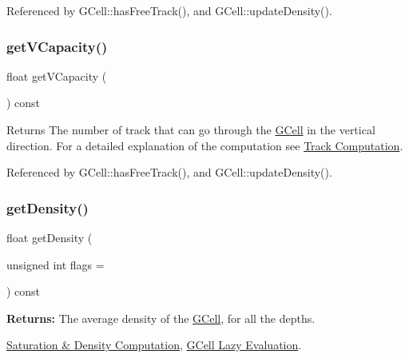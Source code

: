 Referenced by G\+Cell\+::has\+Free\+Track(), and G\+Cell\+::update\+Density().

\mbox{\label{classKatabatic_1_1GCell_a3994e204ebccf8aa12899e0c5ef4112b}} 
\subsubsection{\texorpdfstring{get\+V\+Capacity()}{getVCapacity()}}
{\footnotesize\ttfamily float get\+V\+Capacity (\begin{DoxyParamCaption}{ }\end{DoxyParamCaption}) const}

\begin{DoxyReturn}{Returns}
The number of track that can go through the \hyperlink{classKatabatic_1_1GCell}{G\+Cell} in the vertical direction. For a detailed explanation of the computation see \hyperlink{classKatabatic_1_1GCell_secGCellTrackComputation}{Track Computation}. 
\end{DoxyReturn}


Referenced by G\+Cell\+::has\+Free\+Track(), and G\+Cell\+::update\+Density().

\mbox{\label{classKatabatic_1_1GCell_ad31c16c87377e164728a0df55e21f96b}} 
\subsubsection{\texorpdfstring{get\+Density()}{getDensity()}}
{\footnotesize\ttfamily float get\+Density (\begin{DoxyParamCaption}\item[{unsigned int}]{flags = {} }\end{DoxyParamCaption}) const}

{\bfseries Returns\+:} The average density of the \hyperlink{classKatabatic_1_1GCell}{G\+Cell}, for all the depths.

\hyperlink{classKatabatic_1_1GCell_secGCellDensity}{Saturation \& Density Computation}, \hyperlink{classKatabatic_1_1GCell_secGCellLazyEvaluation}{G\+Cell Lazy Evaluation}. 

